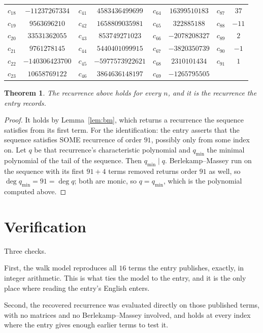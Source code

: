 \documentclass[11pt,a4paper]{article}
\theoremstyle{plain}
\newtheorem{theorem}{Theorem}
\theoremstyle{definition}
\begin{document}
\begin{center}
\begin{tabular}{cccccccc}
$c_{18}$ & $-11237267334$ & $c_{41}$ & $4583436499699$ & $c_{64}$ & $16399510183$ & $c_{87}$ & $37$ \\
$c_{19}$ & $9563696210$ & $c_{42}$ & $1658809035981$ & $c_{65}$ & $322885188$ & $c_{88}$ & $-11$ \\
$c_{20}$ & $33531362055$ & $c_{43}$ & $853749271023$ & $c_{66}$ & $-2078208327$ & $c_{89}$ & $2$ \\
$c_{21}$ & $9761278145$ & $c_{44}$ & $5440401099915$ & $c_{67}$ & $-3820350739$ & $c_{90}$ & $-1$ \\
$c_{22}$ & $-140306423700$ & $c_{45}$ & $-5977573922621$ & $c_{68}$ & $2310101434$ & $c_{91}$ & $1$ \\
$c_{23}$ & $10658769122$ & $c_{46}$ & $3864636148197$ & $c_{69}$ & $-1265795505$ &  &  \\
\end{tabular}
\end{center}

\begin{theorem}
The recurrence above holds for every $n$, and it is the recurrence the entry records.
\end{theorem}

\begin{proof}
It holds by Lemma~\ref{lem:bm}, which returns a recurrence the sequence satisfies from its
first term. For the identification: the entry asserts that the sequence satisfies SOME
recurrence of order $91$, possibly only from some index on. Let $q$ be that recurrence's
characteristic polynomial and $q_{\min}$ the minimal polynomial of the tail of the sequence.
Then $q_{\min}\mid q$. Berlekamp--Massey run on the sequence with its first $91+4$ terms
removed returns order $91$ as well, so $\deg q_{\min}=91=\deg q$; both are monic, so
$q=q_{\min}$, which is the polynomial computed above.
\end{proof}

\section{Verification}

Three checks.

First, the walk model reproduces all $16$ terms the entry publishes, exactly, in integer
arithmetic. This is what ties the model to the entry, and it is the only place where reading
the entry's English enters.

Second, the recovered recurrence was evaluated directly on those published terms, with no
matrices and no Berlekamp--Massey involved, and holds at every index where the entry gives
enough earlier terms to test it.
\end{document}
